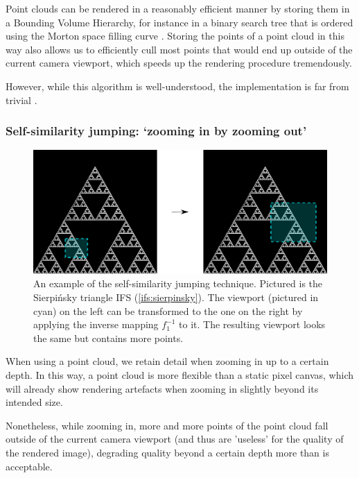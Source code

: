 \documentclass[11pt]{article}
\begin{document}
Point clouds can be rendered in a reasonably efficient manner by storing them in a Bounding Volume Hierarchy,
for instance in a binary search tree that is ordered using the Morton space filling curve \cite{lauterbach2009construction}.
Storing the points of a point cloud in this way also allows us to efficiently cull most points that would end up outside of the current camera viewport,
which speeds up the rendering procedure tremendously.

However, while this algorithm is well-understood, the implementation is far from trivial \cite{lauterbach2009construction}.

\subsubsection{Self-similarity jumping: `zooming in by zooming out'}
\label{sec:org60c4c7b}
\label{subsection:self_similarity}

\begin{figure}

\includegraphics[width=\textwidth]{figures/sierpinsky_jump}
\caption{An example of the self-similarity jumping technique. Pictured is the Sierpi\'nsky triangle IFS (\autoref{ifs:sierpinsky}).
The viewport (pictured in cyan) on the left can be transformed to the one on the right by applying the inverse mapping $f_1^{-1}$ to it.
The resulting viewport looks the same but contains more points.}
\label{figure:sierpinsky_jump}
\end{figure}

When using a point cloud, we retain detail when zooming in up to a certain depth. In this way, a point cloud is more flexible than a 
static pixel canvas, which will already show rendering artefacts when zooming in slightly beyond its intended size.

Nonetheless, while zooming in, more and more points of the point cloud fall outside of the current camera viewport
(and thus are 'useless' for the quality of the rendered image), degrading quality beyond a certain depth more than is acceptable.
\end{document}
